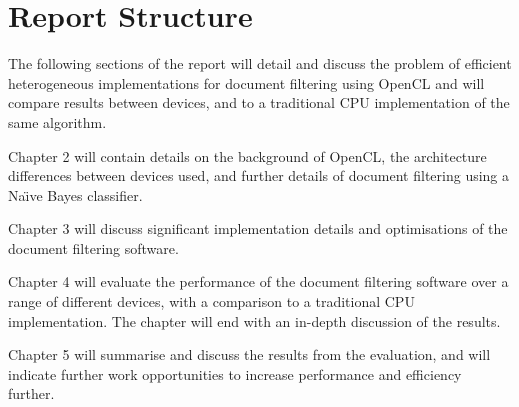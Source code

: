 \section{Report Structure}

The following sections of the report will detail and discuss the problem of
efficient heterogeneous implementations for document filtering using OpenCL and
will compare results between devices, and to a traditional CPU implementation of
the same algorithm.

Chapter 2 will contain details on the background of OpenCL, the architecture
differences between devices used, and further details of document filtering
using a Na{\"{\i}}ve Bayes classifier.

Chapter 3 will discuss significant implementation details and optimisations of
the document filtering software.

Chapter 4 will evaluate the performance of the document filtering software over
a range of different devices, with a comparison to a traditional CPU
implementation. The chapter will end with an in-depth discussion of the results.

Chapter 5 will summarise and discuss the results from the evaluation, and will
indicate further work opportunities to increase performance and efficiency
further.
